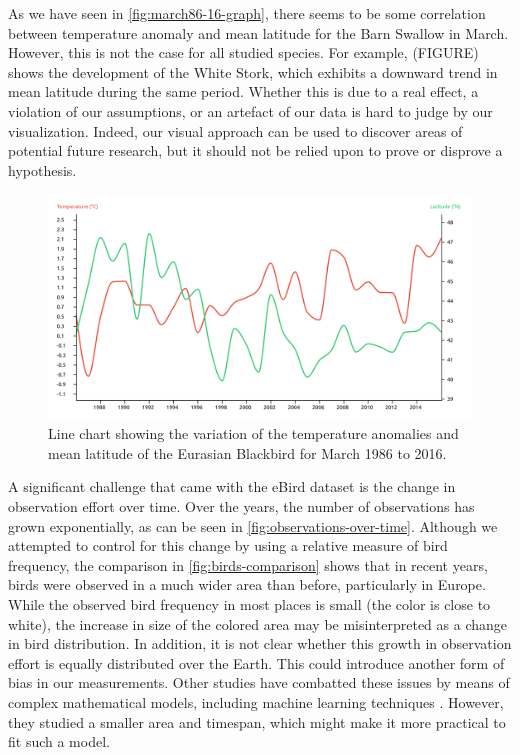 \documentclass[journal]{vgtc}                %
\begin{document}
As we have seen in \autoref{fig:march86-16-graph}, there seems to be some correlation between temperature anomaly and mean latitude for the Barn Swallow in March. However, this is not the case for all studied species. For example, (FIGURE) shows the development of the White Stork, which exhibits a downward trend in mean latitude during the same period. Whether this is due to a real effect, a violation of our assumptions, or an artefact of our data is hard to judge by our visualization. Indeed, our visual approach can be used to discover areas of potential future research, but it should not be relied upon to prove or disprove a hypothesis.

\begin{figure}[t]
  \centering
  \includegraphics[width=\linewidth]{march86-16-graph-eurbla}
  \caption{Line chart showing the variation of the temperature anomalies and mean latitude of the Eurasian Blackbird for March 1986 to 2016.}
  \label{fig:march86-16-graph-eurbla}
\end{figure}

A significant challenge that came with the eBird dataset is the change in observation effort over time. Over the years, the number of observations has grown exponentially, as can be seen in \autoref{fig:observations-over-time}. Although we attempted to control for this change by using a relative measure of bird frequency, the comparison in \autoref{fig:birds-comparison} shows that in recent years, birds were observed in a much wider area than before, particularly in Europe. While the observed bird frequency in most places is small (the color is close to white), the increase in size of the colored area may be misinterpreted as a change in bird distribution. In addition, it is not clear whether this growth in observation effort is equally distributed over the Earth. This could introduce another form of bias in our measurements. Other studies have combatted these issues by means of complex mathematical models, including machine learning techniques \cite{johnston2019best,johnston2020analytical}. However, they studied a smaller area and timespan, which might make it more practical to fit such a model.
\end{document}
